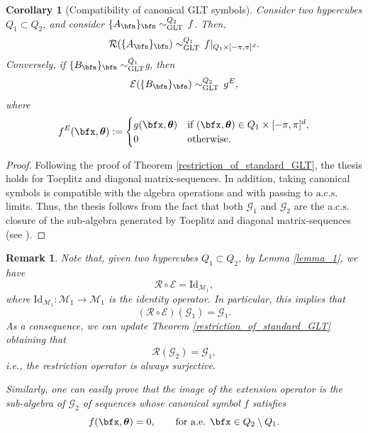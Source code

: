 \documentclass{amsart}
\newtheorem{cor}[thm]{Corollary}
\newtheorem{rem}[thm]{Remark}
\newcommand{\bftheta}{{\boldsymbol\theta}}
\begin{document}
 \begin{cor}[Compatibility of canonical GLT symbols]\label{cor_restr_ext_standard_GLT_symbol}
        Consider two hypercubes $Q_1\subset Q_2$, and consider $\{A_\bfn\}_\bfn\sim_{\mathrm{GLT}}^{Q_2}\, f$. 
        Then, 
        \begin{equation*}
            \mathcal{R}(\{A_\bfn\}_\bfn)\sim_{\mathrm{GLT}}^{Q_1}\,f|_{Q_1\times[-\pi,\pi]^d}.
        \end{equation*}
        Conversely, if $\{B_\bfn\}_\bfn\sim_{\mathrm{GLT}}^{Q_1}$g, then
        \begin{equation*}
            \mathcal{E}(\{B_\bfn\}_\bfn)\sim_{\mathrm{GLT}}^{Q_2}\,g^E,
        \end{equation*}
        where
        \begin{equation*}
            f^E(\bfx,\bftheta):=\begin{cases}
	g(\bfx,\bftheta) & \text{if } (\bfx,\bftheta)\in Q_1\times[-\pi,\pi]^d, \\
	0 & \text{otherwise.}
	\end{cases}
        \end{equation*}
    \end{cor}
    \begin{proof}
        Following the proof of Theorem \ref{restriction_of_standard_GLT}, the thesis holds for Toeplitz and diagonal matrix-sequences. In addition, taking canonical symbols is compatible with the algebra operations and with passing to $\mathrm{a.c.s.}$ limits. Thus, the thesis follows from the fact that both $\mathcal{G}_1$ and $\mathcal{G}_2$ are the $\mathrm{a.c.s.}$ closure of the sub-algebra generated by Toeplitz and diagonal matrix-sequences (see \cite[Theorem 8.6]{glt-book-1}).
    \end{proof}
\begin{rem}\label{rest_surjective}
    Note that, given two hypercubes $Q_1\subset Q_2$, by Lemma \ref{lemma_1}, we have
    \begin{equation*}
        \mathcal{R}\circ\mathcal{E}=\mathrm{Id}_{\mathcal{M}_1},
    \end{equation*}
    where $\mathrm{Id}_{\mathcal{M}_1}:\mathcal{M}_1\to\mathcal{M}_1$ is the identity operator. In particular, this implies that
    \begin{equation*}
        (\mathcal{R}\circ\mathcal{E})(\mathcal{G}_1)=\mathcal{G}_1.
    \end{equation*}
    As a consequence, we can update Theorem \ref{restriction_of_standard_GLT} obtaining that
    \begin{equation*}
        \mathcal{R}(\mathcal{G}_2)=\mathcal{G}_1,
    \end{equation*}
    i.e., the restriction operator is always surjective. 
    
    Similarly, one can easily prove that the image of the extension operator is the sub-algebra of $\mathcal{G}_2$ of sequences whose canonical symbol $f$ satisfies
    \begin{equation*}
        f(\bfx,\bftheta)=0,\qquad \text{for a.e. }\bfx\in Q_2\setminus Q_1.
    \end{equation*}
    \end{rem}
    
\end{document}
